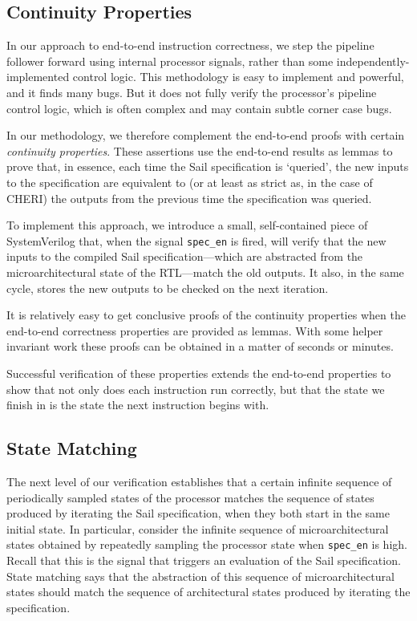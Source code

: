 \documentclass[10pt,conference]{IEEEtran}
\begin{document}
\subsection{Continuity Properties}

In our approach to end-to-end instruction correctness, we step the pipeline
follower forward using internal processor signals, rather than some
independently-implemented control logic. This methodology is easy to
implement and powerful, and it finds many bugs. But it does not fully
verify the processor's pipeline control logic, which is often complex and
may contain subtle corner case bugs.

In our methodology, we therefore complement the end-to-end proofs with
certain \textit{continuity properties}. These assertions use the end-to-end
results as lemmas to prove that, in essence, each time the Sail
specification is `queried', the new inputs to the specification are
equivalent to (or at least as strict as, in the case of CHERI) the outputs
from the previous time the specification was queried.

To implement this approach, we introduce a small, self-contained piece of
SystemVerilog that, when the signal \verb|spec_en| is fired, will verify
that the new inputs to the compiled Sail specification---which are
abstracted from the microarchitectural state of the RTL---match the old
outputs. It also, in the same cycle, stores the new outputs to be checked on
the next iteration.

It is relatively easy to get conclusive proofs of the continuity
properties when the end-to-end correctness properties are provided as lemmas.
With some helper invariant work these proofs can be obtained in a matter of seconds
or minutes.

Successful verification of these properties extends the end-to-end properties to show
that not only does each instruction run correctly, but that the state we finish in is
the state the next instruction begins with.

\subsection{State Matching}

The next level of our verification establishes that a certain infinite
sequence of periodically sampled states of the processor matches the
sequence of states produced by iterating the Sail specification, when they
both start in the same initial state.  In particular, consider the infinite
sequence of microarchitectural states obtained by repeatedly sampling the
processor state when \verb|spec_en| is high.  Recall that this is the
signal that triggers an evaluation of the Sail specification.  State
matching says that the abstraction of this sequence of microarchitectural
states should match the sequence of architectural states produced by
iterating the specification.
\end{document}
